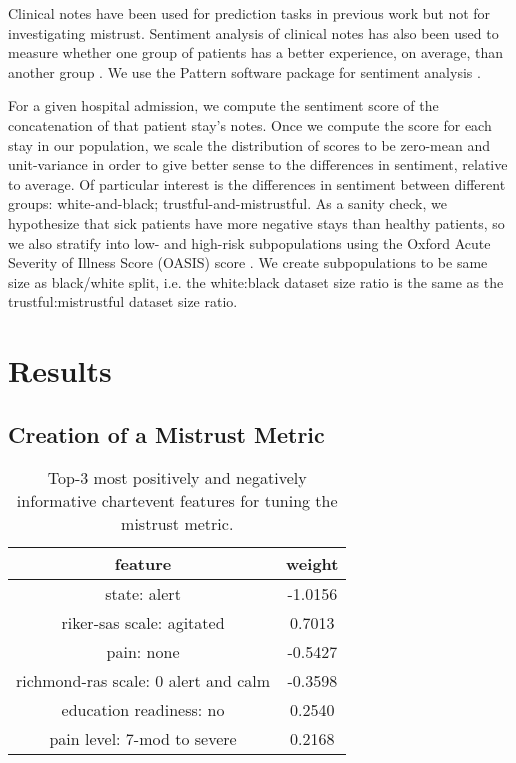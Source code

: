 \documentclass{article}
\begin{document}
Clinical notes have been used for prediction tasks in previous work \citep{ghassemi2014unfolding} but not for investigating mistrust. Sentiment analysis of clinical notes has also been used to measure whether one group of patients has a better experience, on average, than another group \cite{roy:sentiment}. We use the Pattern software package for sentiment analysis \cite{pattern}. 

For a given hospital admission, we compute the sentiment score of the concatenation of that patient stay's notes. Once we compute the score for each stay in our population, we scale the distribution of scores to be zero-mean and unit-variance in order to give better sense to the differences in sentiment, relative to average. Of particular interest is the differences in sentiment between different groups: white-and-black; trustful-and-mistrustful. As a sanity check, we hypothesize that sick patients have more negative stays than healthy patients, so we also stratify into low- and high-risk subpopulations using the Oxford Acute Severity of Illness Score (OASIS) score \cite{johnson:oasis}. We create subpopulations to be same size as black/white split, i.e. the white:black dataset size ratio is the same as the trustful:mistrustful dataset size ratio.

\section{Results}
\subsection{Creation of a Mistrust Metric}

\begin{table}
  \begin{center}
    \caption{Top-3 most positively and negatively informative chartevent features for tuning the mistrust metric.}
    \label{tab:metric-weights}
    \hspace*{-1cm}
    \begin{tabular}{|c|c|}
    	\hline
                     \textbf{feature} & \textbf{weight} \\ \hline \hline
                         state: alert & -1.0156  \\ \hline
            riker-sas scale: agitated &  0.7013  \\ \hline
                           pain: none & -0.5427  \\ \hline
richmond-ras scale: 0 alert and calm  & -0.3598  \\ \hline
              education readiness: no &  0.2540  \\ \hline
         pain level: 7-mod to severe  &  0.2168  \\ \hline
    \end{tabular}
  \end{center}
\end{table}
\end{document}
